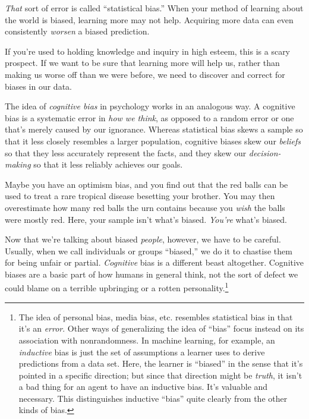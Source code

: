 \documentclass[letterpaper]{book}
\newcommand{\comment}[1]{
}
\begin{document}
{
 \textit{That} sort of error is called
``statistical bias.'' When your
method of learning about the world is biased, learning more may not
help. Acquiring more data can even consistently \textit{worsen} a
biased prediction.}

{
 If you're used to holding knowledge and inquiry in
high esteem, this is a scary prospect. If we want to be sure that
learning more will help us, rather than making us worse off than we
were before, we need to discover and correct for biases in our data.}

{
 The idea of \textit{cognitive bias} in psychology works in an
analogous way. A cognitive bias is a systematic error in \textit{how we
think}, as opposed to a random error or one that's
merely caused by our ignorance. Whereas statistical bias skews a sample
so that it less closely resembles a larger population, cognitive biases
skew our \textit{beliefs} so that they less accurately represent the
facts, and they skew our \textit{decision-making} so that it less
reliably achieves our goals.}

{
 Maybe you have an optimism bias, and you find out that the red
balls can be used to treat a rare tropical disease besetting your
brother. You may then overestimate how many red balls the urn contains
because you \textit{wish} the balls were mostly red. Here, your sample
isn't what's biased.
\textit{You're} what's biased.}

{
 Now that we're talking about biased
\textit{people}, however, we have to be careful. Usually, when we call
individuals or groups ``biased,'' we
do it to chastise them for being unfair or partial. \textit{Cognitive}
bias is a different beast altogether. Cognitive biases are a basic part
of how humans in general think, not the sort of defect we could blame
on a terrible upbringing or a rotten personality.\footnote{The idea of personal bias, media bias, etc. resembles
statistical bias in that it's an \textit{error}. Other
ways of generalizing the idea of
``bias'' focus instead on its
association with nonrandomness. In machine learning, for example, an
\textit{inductive} bias is just the set of assumptions a learner uses
to derive predictions from a data set. Here, the learner is
``biased'' in the sense that
it's pointed in a specific direction; but since that
direction might be \textit{truth}, it isn't a bad thing
for an agent to have an inductive bias. It's valuable
and necessary. This distinguishes inductive
``bias'' quite clearly from the
other kinds of bias.\comment{1}}}
\end{document}
